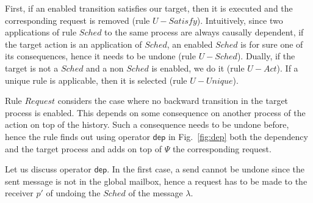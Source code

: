 \documentclass[runningheads]{llncs}
\newcommand{\ms}[1]{\mathsf{#1}}
\begin{document}
First, if an enabled transition satisfies our target, then it is executed and the corresponding request is removed (rule $U-Satisfy$). 
Intuitively, since two applications of rule $\mathit{Sched}$ to the same process are always causally dependent, if the target action is an application of $\mathit{Sched}$, an enabled $\mathit{Sched}$ is for sure one of its consequences, hence it needs to be undone (rule $U-Sched$). Dually, if the target is not a $\mathit{Sched}$ and a non $\mathit{Sched}$ is enabled, we do it (rule $U-Act$). If a unique rule is applicable, then it is selected (rule $U-Unique$). 


Rule $Request$ considers the case where no backward transition in the
target process is enabled. This depends on some consequence on another
process of the action on top of the history. Such a consequence needs
to be undone before, hence the rule finds out using operator
$\ms{dep}$ in Fig.~\ref{fig:dep} both the dependency and the target process and adds on top of $\Psi$ the corresponding
request.

Let us discuss operator $\ms{dep}$. In the first case, a send cannot
be undone since the sent message is not in the global mailbox, hence a
request has to be made to the receiver $p'$ of undoing the $Sched$ of
the message $\lambda$.
\end{document}
